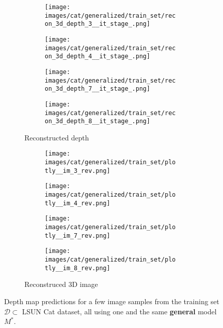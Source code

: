 \begin{figure}[!htb]
\begin{subfigure}{\textwidth}
    \begin{subfigure}{0.24\textwidth}
    \centering
    \texttt{[image: images/cat/generalized/train\_set/recon\_3d\_depth\_3\_\_it\_stage\_.png]}
\end{subfigure}
\begin{subfigure}{0.24\textwidth}
    \centering
    \texttt{[image: images/cat/generalized/train\_set/recon\_3d\_depth\_4\_\_it\_stage\_.png]}
\end{subfigure}
\begin{subfigure}{0.24\textwidth}
    \centering
    \texttt{[image: images/cat/generalized/train\_set/recon\_3d\_depth\_7\_\_it\_stage\_.png]}
\end{subfigure}
\begin{subfigure}{0.24\textwidth}
    \centering
    \texttt{[image: images/cat/generalized/train\_set/recon\_3d\_depth\_8\_\_it\_stage\_.png]}
\end{subfigure}
    \caption{Reconstructed depth}
\end{subfigure}
\begin{subfigure}{\textwidth}
    \begin{subfigure}{0.24\textwidth}
    \centering
    \texttt{[image: images/cat/generalized/train\_set/plotly\_\_im\_3\_rev.png]}
\end{subfigure}
\begin{subfigure}{0.24\textwidth}
    \centering
    \texttt{[image: images/cat/generalized/train\_set/plotly\_\_im\_4\_rev.png]}
\end{subfigure}
\begin{subfigure}{0.24\textwidth}
    \centering
    \texttt{[image: images/cat/generalized/train\_set/plotly\_\_im\_7\_rev.png]}
\end{subfigure}
\begin{subfigure}{0.24\textwidth}
    \centering
    \texttt{[image: images/cat/generalized/train\_set/plotly\_\_im\_8\_rev.png]}
    \label{}
\end{subfigure}
\caption{Reconstruced 3D image}
\end{subfigure}
    \caption{Depth map predictions for a few image samples from the training set $\mathcal{D} \subset$ LSUN Cat dataset, all using one and the same  \textbf{general} model $M^*$.}
    \label{fig:gen_LSUN_Cat_train}
\end{figure}


